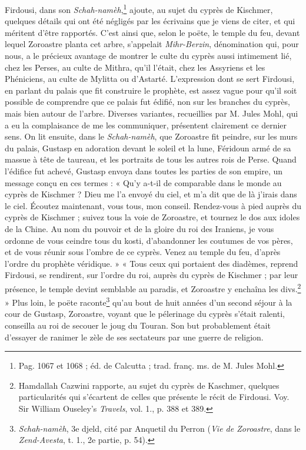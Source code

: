\documentclass[a4paper, 11pt, oneside, polutonikogreek, french]{article}
\begin{document}
Firdousi, dans son \emph{Schah-namèh},\footnote{Pag. 1067 et 1068 ; éd. de Calcutta ; trad. franç. ms. de M. Jules Mohl.} ajoute, au sujet du cyprès de Kischmer, quelques détails qui ont été négligés par les écrivains que je viens de citer, et qui méritent d'être rapportés. C'est ainsi que, selon le poëte, le temple du feu, devant lequel Zoroastre planta cet arbre, s'appelait \emph{Mihr-Berzin}, dénomination qui, pour nous, a le précieux avantage de montrer le culte du cyprès aussi intimement lié, chez les Perses, au culte de Mithra, qu'il l'était, chez les Assyriens et les Phéniciens, au culte de Mylitta ou d'Astarté. L'expression dont se sert Firdousi, en parlant du palais que fit construire le prophète, est assez vague pour qu'il soit possible de comprendre que ce palais fut édifié, non sur les branches du cyprès, mais bien autour de l'arbre. Diverses variantes, recueillies par M. Jules Mohl, qui a eu la complaisance de me les communiquer, présentent clairement ce dernier sens. On lit ensuite, dans le \emph{Schah-namèh}, que Zoroastre fit peindre, sur les murs du palais, Gustasp en adoration devant le soleil et la lune, Féridoun armé de sa massue à tête de taureau, et les portraits de tous les autres rois de Perse. Quand l'édifice fut achevé, Gustasp envoya dans toutes les parties de son empire, un message conçu en ces termes : « Qu'y a-t-il de comparable dans le monde au cyprès de Kischmer ? Dieu me l'a envoyé du ciel, et m'a dit que de là j'irais dans le ciel. Écoutez maintenant, vous tous, mon conseil. Rendez-vous à pied auprès du cyprès de Kischmer ; suivez tous la voie de Zoroastre, et tournez le dos aux idoles de la Chine. Au nom du pouvoir et de la gloire du roi des Iraniens, je vous ordonne de vous ceindre tous du kosti, d'abandonner les coutumes de vos pères, et de vous réunir sous l'ombre de ce cyprès. Venez au temple du feu, d'après l'ordre du prophète véridique. » « Tous ceux qui portaient des diadèmes, reprend Firdousi, se rendirent, sur l'ordre du roi, auprès du cyprès de Kischmer ; par leur présence, le temple devint semblable au paradis, et Zoroastre y enchaîna les divs.\footnote{Hamdallah Cazwini rapporte, au sujet du cyprès de Kaschmer, quelques particularités qui s'écartent de celles que présente le récit de Firdousi. Voy. Sir William Ouseley's \emph{Travels}, vol. 1., p. 388 et 389.} » Plus loin, le poëte raconte\footnote{\emph{Schah-namèh}, 3e djeld, cité par Anquetil du Perron (\emph{Vie de Zoroastre}, dans le \emph{Zend-Avesta}, t. 1., 2e partie, p. 54).} qu'au bout de huit années d'un second séjour à la cour de Gustasp, Zoroastre, voyant que le pélerinage du cyprès s'était ralenti, conseilla au roi de secouer le joug du Touran. Son but probablement était d'essayer de ranimer le zèle de ses sectateurs par une guerre de religion.
\end{document}
